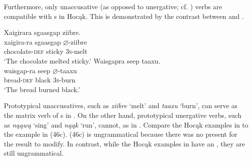 \documentclass[output=paper]{LSP/langsci}
\begin{document}
Furthermore, only unaccusative (as opposed to unergative; cf. \citealt{Perlmutter1978}) verbs are compatible with s in Hocąk. This is demonstrated by the contrast between  and .

\begin{exe}
\ex\label{ex:jrs:48}
\begin{xlist}
\ex     
\glll Xaigirara			sgaasgap		ziibre.\\
xaigira-ra			sgaasgap		$\varnothing$-ziibre \\
	chocolate-\textsc{def}	sticky			\textsc{3s}-melt \\
\trans `The chocolate melted sticky.'
\ex  
\glll Waisgapra		seep		taaxu.\\
waisgap-ra		seep		$\varnothing$-taaxu \\
	bread-\textsc{def}		black		\textsc{3s}-burn \\
\trans `The bread burned black.'
\end{xlist}
\end{exe}
\begin{exe}
\ex\label{ex:jrs:49}
\begin{xlist}
\end{xlist}
\end{exe}

Prototypical unaccusatives, such as \textit{ziibre} `melt' and \textit{taaxu} `burn', can serve as the matrix verb of s in . On the other hand, prototypical unergative verbs, such as \textit{nąąwą} `sing' and \textit{nąąk} `run', cannot, as in . Compare the Hocąk examples in  to the  example in (46c). (46c) is ungrammatical because there was no  present for the result  to modify. In contrast, while the Hocąk examples in  have an , they are still ungrammatical.
	
\end{document}
